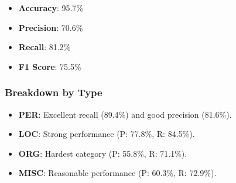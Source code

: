 \documentclass{article}
\begin{document}
\begin{itemize}
    \item \textbf{Accuracy}: 95.7\%
    \item \textbf{Precision}: 70.6\%
    \item \textbf{Recall}: 81.2\%
    \item \textbf{F1 Score}: 75.5\%
\end{itemize}

\subsubsection*{Breakdown by Type}
\begin{itemize}
    \item \textbf{PER}: Excellent recall (89.4\%) and good precision (81.6\%).
    \item \textbf{LOC}: Strong performance (P: 77.8\%, R: 84.5\%).
    \item \textbf{ORG}: Hardest category (P: 55.8\%, R: 71.1\%).
    \item \textbf{MISC}: Reasonable performance (P: 60.3\%, R: 72.9\%).
\end{itemize}
\end{document}
